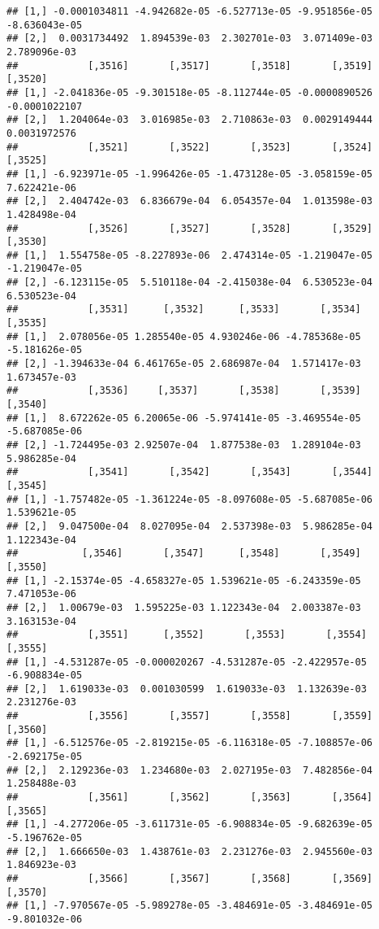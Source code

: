\documentclass[
]{article}
\begin{document}
\begin{verbatim}
## [1,] -0.0001034811 -4.942682e-05 -6.527713e-05 -9.951856e-05 -8.636043e-05
## [2,]  0.0031734492  1.894539e-03  2.302701e-03  3.071409e-03  2.789096e-03
##            [,3516]       [,3517]       [,3518]       [,3519]       [,3520]
## [1,] -2.041836e-05 -9.301518e-05 -8.112744e-05 -0.0000890526 -0.0001022107
## [2,]  1.204064e-03  3.016985e-03  2.710863e-03  0.0029149444  0.0031972576
##            [,3521]       [,3522]       [,3523]       [,3524]      [,3525]
## [1,] -6.923971e-05 -1.996426e-05 -1.473128e-05 -3.058159e-05 7.622421e-06
## [2,]  2.404742e-03  6.836679e-04  6.054357e-04  1.013598e-03 1.428498e-04
##            [,3526]       [,3527]       [,3528]       [,3529]       [,3530]
## [1,]  1.554758e-05 -8.227893e-06  2.474314e-05 -1.219047e-05 -1.219047e-05
## [2,] -6.123115e-05  5.510118e-04 -2.415038e-04  6.530523e-04  6.530523e-04
##            [,3531]      [,3532]      [,3533]       [,3534]       [,3535]
## [1,]  2.078056e-05 1.285540e-05 4.930246e-06 -4.785368e-05 -5.181626e-05
## [2,] -1.394633e-04 6.461765e-05 2.686987e-04  1.571417e-03  1.673457e-03
##            [,3536]     [,3537]       [,3538]       [,3539]       [,3540]
## [1,]  8.672262e-05 6.20065e-06 -5.974141e-05 -3.469554e-05 -5.687085e-06
## [2,] -1.724495e-03 2.92507e-04  1.877538e-03  1.289104e-03  5.986285e-04
##            [,3541]       [,3542]       [,3543]       [,3544]      [,3545]
## [1,] -1.757482e-05 -1.361224e-05 -8.097608e-05 -5.687085e-06 1.539621e-05
## [2,]  9.047500e-04  8.027095e-04  2.537398e-03  5.986285e-04 1.122343e-04
##           [,3546]       [,3547]      [,3548]       [,3549]      [,3550]
## [1,] -2.15374e-05 -4.658327e-05 1.539621e-05 -6.243359e-05 7.471053e-06
## [2,]  1.00679e-03  1.595225e-03 1.122343e-04  2.003387e-03 3.163153e-04
##            [,3551]      [,3552]       [,3553]       [,3554]       [,3555]
## [1,] -4.531287e-05 -0.000020267 -4.531287e-05 -2.422957e-05 -6.908834e-05
## [2,]  1.619033e-03  0.001030599  1.619033e-03  1.132639e-03  2.231276e-03
##            [,3556]       [,3557]       [,3558]       [,3559]       [,3560]
## [1,] -6.512576e-05 -2.819215e-05 -6.116318e-05 -7.108857e-06 -2.692175e-05
## [2,]  2.129236e-03  1.234680e-03  2.027195e-03  7.482856e-04  1.258488e-03
##            [,3561]       [,3562]       [,3563]       [,3564]       [,3565]
## [1,] -4.277206e-05 -3.611731e-05 -6.908834e-05 -9.682639e-05 -5.196762e-05
## [2,]  1.666650e-03  1.438761e-03  2.231276e-03  2.945560e-03  1.846923e-03
##            [,3566]       [,3567]       [,3568]       [,3569]       [,3570]
## [1,] -7.970567e-05 -5.989278e-05 -3.484691e-05 -3.484691e-05 -9.801032e-06

\end{verbatim}
\end{document}
